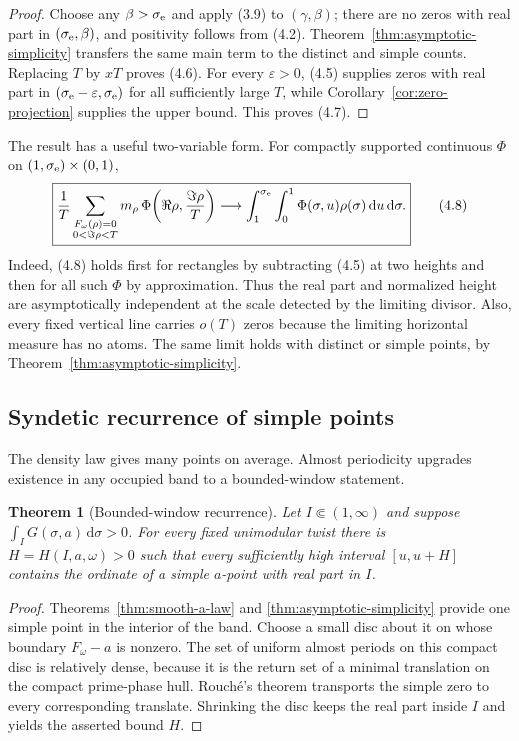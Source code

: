 \documentclass[11pt]{article}
\newtheorem{theorem}{Theorem}[section]
\theoremstyle{definition}
\theoremstyle{remark}
\newcommand{\dd}{\,\mathrm d}
\newcommand{\eps}{\varepsilon}
\begin{document}
\begin{proof}
Choose any $\beta>\sigma_{\rm e}$ and apply (3.9) to $(\gamma,\beta)$; there
are no zeros with real part in $(\sigma_{\rm e},\beta)$, and
positivity follows from (4.2).  Theorem~\ref{thm:asymptotic-simplicity} transfers the
same main term to the distinct and simple counts.  Replacing $T$ by $xT$ proves
(4.6).  For every
$\eps>0$, (4.5) supplies zeros with real part in
$(\sigma_{\rm e}-\eps,\sigma_{\rm e})$ for all sufficiently large $T$, while
Corollary~\ref{cor:zero-projection} supplies the upper bound.  This proves (4.7).
\end{proof}

The result has a useful two-variable form.  For compactly supported continuous
$\Phi$ on $(1,\sigma_{\rm e})\times(0,1)$,
\[
 \boxed{
 \frac1T\sum_{\substack{F_\omega(\rho)=0\\0<\Im\rho<T}}
 m_\rho\,
 \Phi\!\left(\Re\rho,\frac{\Im\rho}{T}\right)
 \longrightarrow
 \int_1^{\sigma_{\rm e}}\int_0^1
 \Phi(\sigma,u)\rho(\sigma)\dd u\dd\sigma.
 }
\tag{4.8}
\]
Indeed, (4.8) holds first for rectangles by subtracting (4.5) at two heights and
then for all such $\Phi$ by approximation.  Thus the real part and normalized height
are asymptotically independent at the scale detected by the limiting divisor.  Also,
every fixed vertical line carries $o(T)$ zeros because the limiting horizontal measure
has no atoms.  The same limit holds with distinct or simple points, by
Theorem~\ref{thm:asymptotic-simplicity}.

\subsection{Syndetic recurrence of simple points}

The density law gives many points on average.  Almost periodicity upgrades existence
in any occupied band to a bounded-window statement.

\begin{theorem}[Bounded-window recurrence]
\label{thm:syndetic-recurrence}
Let $I\Subset(1,\infty)$ and suppose
$\int_I G(\sigma,a)\dd\sigma>0$.  For every fixed unimodular twist there is
$H=H(I,a,\omega)>0$ such that every sufficiently high interval $[u,u+H]$ contains
the ordinate of a simple $a$-point with real part in $I$.
\end{theorem}

\begin{proof}
Theorems~\ref{thm:smooth-a-law} and \ref{thm:asymptotic-simplicity} provide one
simple point in the interior of the band.  Choose a small disc about it on whose
boundary $F_\omega-a$ is nonzero.  The set of uniform almost periods on this compact
disc is relatively dense, because it is the return set of a minimal translation on
the compact prime-phase hull.  Rouch\'e's theorem transports the simple zero to every
corresponding translate.  Shrinking the disc keeps the real part inside $I$ and yields
the asserted bound $H$.
\end{proof}
\end{document}
